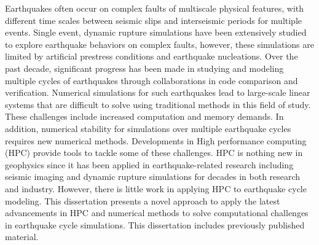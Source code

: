 Earthquakes often occur on complex faults of multiscale physical features, with different time scales between seismic slips and interseismic periods for multiple events.
Single event, dynamic rupture simulations have been extensively studied to explore earthquake behaviors on complex faults, however, these simulations are limited by artificial prestress conditions and earthquake nucleations.
Over the past decade, significant progress has been made in studying and modeling multiple cycles of earthquakes through collaborations in code comparison and verification.
Numerical simulations for such earthquakes lead to large-scale linear systems that are difficult to solve using traditional methods in this field of study.
These challenges include increased computation and memory demands.
In addition, numerical stability for simulations over multiple earthquake cycles requires new numerical methods.
Developments in High performance computing (HPC) provide tools to tackle some of these challenges.
HPC is nothing new in geophysics since it has been applied in earthquake-related research including seismic imaging and dynamic rupture simulations for decades in both research and industry.
However, there is little work in applying HPC to earthquake cycle modeling. 
This dissertation presents a novel approach to apply the latest advancements in HPC and numerical methods to solve computational challenges in earthquake cycle simulations.
This dissertation includes previously published material.